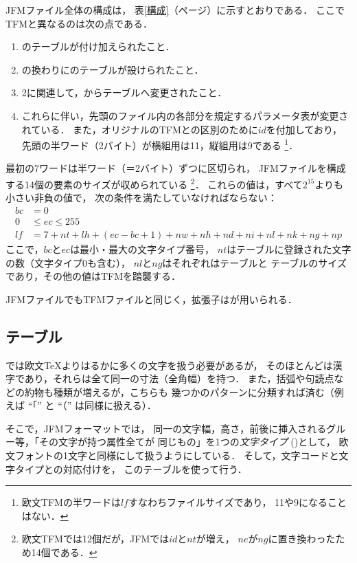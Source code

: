 \documentclass[a4paper,11pt,nomag]{jsarticle}
\def\size#1{\mathit{#1}}
\begin{document}
JFMファイル全体の構成は，
表\ref{構成}（\pageref{構成}ページ）に示すとおりである．
ここでTFMと異なるのは次の点である．
\begin{enumerate}
\item {}のテーブルが付け加えられたこと．
\item {}の換わりにのテーブルが設けられたこと．
\item 2に関連して，からテーブルへ変更されたこと．
\item これらに伴い，先頭のファイル内の各部分を規定するパラメータ表が変更されている．
  また，オリジナルのTFMとの区別のために$\size{id}$を付加しており，
  先頭の半ワード（2バイト）が横組用は11，縦組用は9である
  \footnote{欧文TFMの半ワードは$\size{lf}$すなわちファイルサイズであり，
  11や9になることはない．}．
\end{enumerate}
最初の7ワードは半ワード（＝2バイト）ずつに区切られ，
JFMファイルを構成する14個の要素のサイズが収められている
\footnote{欧文TFMでは12個だが，JFMでは$\size{id}$と$\size{nt}$が増え，
$\size{ne}$が$\size{ng}$に置き換わったため14個である．}．
これらの値は，すべて$2^{15}$よりも小さい非負の値で，
次の条件を満たしていなければならない：
\begin{align*}
\size{bc} &= 0 \\
0 &\leq \size{ec} \leq 255 \\
\size{lf} &= 7+\size{nt}+\size{lh}+(\size{ec}-\size{bc}+1)+\size{nw}+\size{nh}
               +\size{nd}+\size{ni}+\size{nl}+\size{nk}+\size{ng}+\size{np}
\end{align*}
ここで，$\size{bc}$と$\size{ec}$は最小・最大の文字タイプ番号，
$\size{nt}$はテーブルに登録された文字の数（文字タイプ0も含む），
$\size{nl}$と$\size{ng}$はそれぞれはテーブルと
テーブルのサイズであり，その他の値はTFMを踏襲する．

JFMファイルでもTFMファイルと同じく，拡張子はが用いられる．

\subsection{テーブル}
\pTeX では欧文\TeX よりはるかに多くの文字を扱う必要があるが，
そのほとんどは漢字であり，それらは全て同一の寸法（全角幅）を持つ．
また，括弧や句読点などの約物も種類が増えるが，こちらも
幾つかのパターンに分類すれば済む（例えば ``「'' と ``（'' は同様に扱える）．

そこで，JFMフォーマットでは，
同一の文字幅，高さ，前後に挿入されるグルー等，「その文字が持つ属性全てが
同じもの」を1つの\emph{文字タイプ} ()として，
欧文フォントの1文字と同様にして扱うようにしている．
そして，文字コードと文字タイプとの対応付けを，
このテーブルを使って行う．
\end{document}
